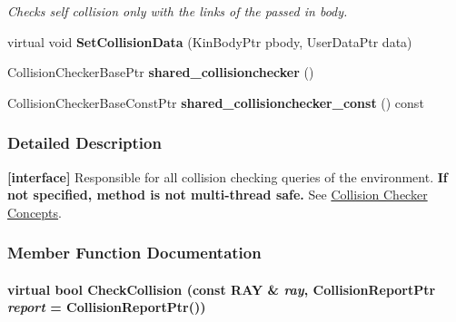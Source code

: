 \begin{DoxyCompactItemize}
\begin{DoxyCompactList}\small\item\em Checks self collision only with the links of the passed in body. \item\end{DoxyCompactList}\item 
\hypertarget{classOpenRAVE_1_1CollisionCheckerBase_a70dbb6e0a6d0ed48a1cdc8a18b7e9d6b}{
virtual void {\bfseries SetCollisionData} (KinBodyPtr pbody, UserDataPtr data)}
\label{classOpenRAVE_1_1CollisionCheckerBase_a70dbb6e0a6d0ed48a1cdc8a18b7e9d6b}

\item 
\hypertarget{classOpenRAVE_1_1CollisionCheckerBase_af79569a9b259e0c635bb3067ea9705a0}{
CollisionCheckerBasePtr {\bfseries shared\_\-collisionchecker} ()}
\label{classOpenRAVE_1_1CollisionCheckerBase_af79569a9b259e0c635bb3067ea9705a0}

\item 
\hypertarget{classOpenRAVE_1_1CollisionCheckerBase_a6744c8192f44ad702df77f90feb1d9b9}{
CollisionCheckerBaseConstPtr {\bfseries shared\_\-collisionchecker\_\-const} () const }
\label{classOpenRAVE_1_1CollisionCheckerBase_a6744c8192f44ad702df77f90feb1d9b9}

\end{DoxyCompactItemize}


\subsubsection{Detailed Description}
{\bfseries \mbox{[}interface\mbox{]}} Responsible for all collision checking queries of the environment. {\bfseries If not specified, method is not multi-\/thread safe.} See \hyperlink{arch__collisionchecker}{Collision Checker Concepts}. 

\subsubsection{Member Function Documentation}
\hypertarget{classOpenRAVE_1_1CollisionCheckerBase_a4c0906fc2d591ac8940c55ad5a16969f}{
\paragraph[{CheckCollision}]{\setlength{\rightskip}{0pt plus 5cm}virtual bool CheckCollision (const {\bf RAY} \& {\em ray}, \/  CollisionReportPtr {\em report} = {\ttfamily CollisionReportPtr()})}\hfill}
\label{classOpenRAVE_1_1CollisionCheckerBase_a4c0906fc2d591ac8940c55ad5a16969f}


